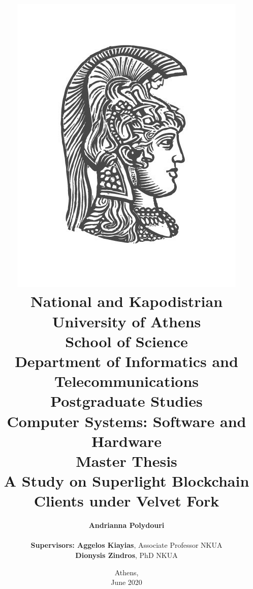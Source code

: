 \title{
    {\includegraphics[scale=0.8]{figures/logo_uoa.jpg}}\\
    {\large National and Kapodistrian University of Athens \\
    School of Science \\
    Department of Informatics and Telecommunications}\\
    \vspace{1cm}
    Postgraduate Studies \\
    Computer Systems: Software and Hardware\\
    \vspace{10mm}
    {Master Thesis}\\
    \vspace{3mm}
    {\textbf{\LARGE A Study on Superlight Blockchain Clients under Velvet Fork}}\\
    \vspace{1cm}
    }

\author{
    \textbf{Andrianna Polydouri} \\
    \vspace{1cm} \\
    \textbf{Supervisors: Aggelos Kiayias}, Associate Professor NKUA\\
    \hspace{0.30cm}
    \textbf{Dionysis Zindros}, PhD NKUA
    \vspace{2cm}
}

\date{Athens, \\ June 2020}